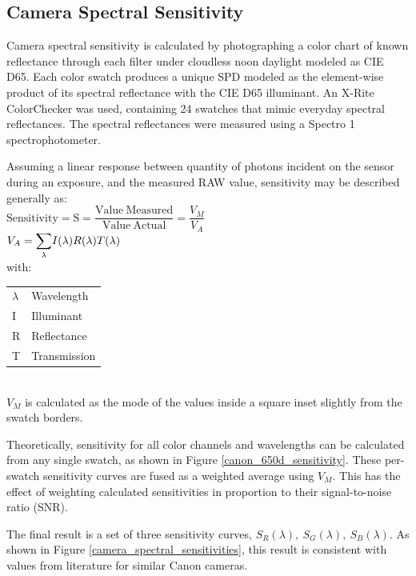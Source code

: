 \documentclass[twocolumn,10pt]{asme2ej}
\newcommand{\id}{\hspace{6 mm}}
\begin{document}
\subsection{Camera Spectral Sensitivity}

\label{Camera_Spectral_Sensitivity}

Camera spectral sensitivity is calculated by photographing a color chart of known reflectance through each filter under cloudless noon daylight modeled as CIE D65. Each color swatch produces a unique SPD modeled as the element-wise product of its spectral reflectance with the CIE D65 illuminant. An X-Rite ColorChecker was used, containing 24 swatches that mimic everyday spectral reflectances. The spectral reflectances were measured using a Spectro 1 spectrophotometer.

\id Assuming a linear response between quantity of photons incident on the sensor during an exposure, and the measured RAW value, sensitivity may be described generally as:\\

$\mathrm{ Sensitivity = S = \dfrac{Value \ Measured}{Value \ Actual} } = \dfrac{V_M}{V_A}$ \\

$V_A = \mathlarger{\sum_{\lambda}} I(\lambda) R(\lambda) T(\lambda)$ \\

 with: \\

\begin{tabular}{l | l}
$\lambda$ & Wavelength \\
I & Illuminant\\
R & Reflectance \\
T & Transmission \\
\end{tabular} \\

$V_M$ is calculated as the mode of the values inside a square inset slightly from the swatch borders.

\id Theoretically, sensitivity for all color channels and wavelengths can be calculated from any single swatch, as shown in Figure \ref{canon_650d_sensitivity}. These per-swatch sensitivity curves are fused as a weighted average using $V_M$. This has the effect of weighting calculated sensitivities in proportion to their signal-to-noise ratio (SNR).

\id The final result is a set of three sensitivity curves, $S_R(\lambda), \ S_G(\lambda), \ S_B(\lambda)$. As shown in Figure \ref{camera_spectral_sensitivities}, this result is consistent with values from literature for similar Canon cameras. \cite{Jiang}
\end{document}
